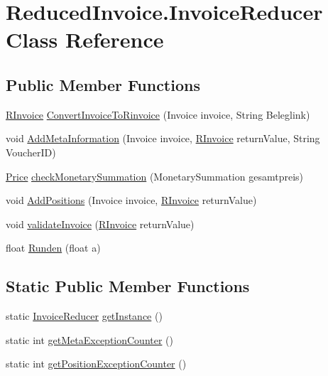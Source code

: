 \hypertarget{class_reduced_invoice_1_1_invoice_reducer}{}\section{Reduced\+Invoice.\+Invoice\+Reducer Class Reference}
\label{class_reduced_invoice_1_1_invoice_reducer}
\subsection*{Public Member Functions}
\begin{DoxyCompactItemize}
\item 
\hyperlink{class_reduced_invoice_1_1_r_invoice}{R\+Invoice} \hyperlink{class_reduced_invoice_1_1_invoice_reducer_ad568f2f09dfbdf8fc59a0a8bed9cac1c}{Convert\+Invoice\+To\+Rinvoice} (Invoice invoice, String Beleglink)
\item 
void \hyperlink{class_reduced_invoice_1_1_invoice_reducer_afb96e9b764742c884dd724cbae728172}{Add\+Meta\+Information} (Invoice invoice, \hyperlink{class_reduced_invoice_1_1_r_invoice}{R\+Invoice} return\+Value, String Voucher\+ID)
\item 
\hyperlink{class_reduced_invoice_1_1_price}{Price} \hyperlink{class_reduced_invoice_1_1_invoice_reducer_a6caff41f142502c44cbeefc7b1e44c9d}{check\+Monetary\+Summation} (Monetary\+Summation gesamtpreis)
\item 
void \hyperlink{class_reduced_invoice_1_1_invoice_reducer_a599dbd87601635791534a8624cb8f953}{Add\+Positions} (Invoice invoice, \hyperlink{class_reduced_invoice_1_1_r_invoice}{R\+Invoice} return\+Value)
\item 
void \hyperlink{class_reduced_invoice_1_1_invoice_reducer_a47e121912714be2caea8d2619c10a2f0}{validate\+Invoice} (\hyperlink{class_reduced_invoice_1_1_r_invoice}{R\+Invoice} return\+Value)
\item 
float \hyperlink{class_reduced_invoice_1_1_invoice_reducer_a4d9155f5cc7223ed2659a8567f9ba1ec}{Runden} (float a)
\end{DoxyCompactItemize}
\subsection*{Static Public Member Functions}
\begin{DoxyCompactItemize}
\item 
static \hyperlink{class_reduced_invoice_1_1_invoice_reducer}{Invoice\+Reducer} \hyperlink{class_reduced_invoice_1_1_invoice_reducer_ad4fafc7b331a78ef243c3e3ba88803da}{get\+Instance} ()
\item 
static int \hyperlink{class_reduced_invoice_1_1_invoice_reducer_a987de6f3876284a7b456240f85dc066f}{get\+Meta\+Exception\+Counter} ()
\item 
static int \hyperlink{class_reduced_invoice_1_1_invoice_reducer_ad5034d72d8eae0edc2026c9ca9e66465}{get\+Position\+Exception\+Counter} ()
\end{DoxyCompactItemize}


